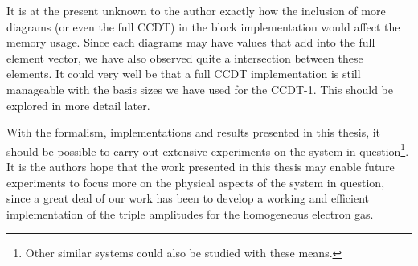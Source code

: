 It is at the present unknown to the author exactly how the inclusion of more diagrams (or even the full CCDT) in the block implementation would affect the memory usage. Since each diagrams may have values that add into the full element vector, we have also observed quite a intersection between these elements. It could very well be that a full CCDT implementation is still manageable with the basis sizes we have used for the CCDT-1. This should be explored in more detail later.

With the formalism, implementations and results presented in this thesis, it should be possible to carry out extensive experiments on the system in question\footnote{Other similar systems could also be studied with these means.}. It is the authors hope that the work presented in this thesis may enable future experiments to focus more on the physical aspects of the system in question, since a great deal of our work has been to develop a working and efficient implementation of the triple amplitudes for the homogeneous electron gas.


